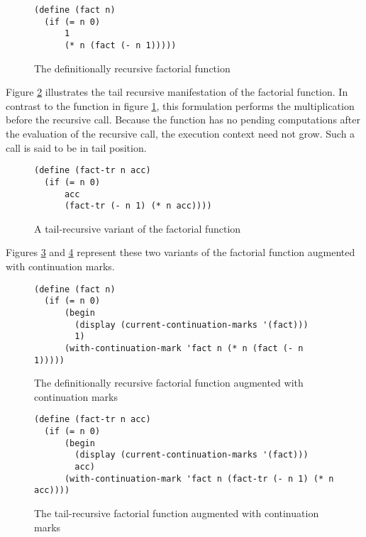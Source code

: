 \documentclass[ms]{byuprop}
\newcounter{definition}
\begin{document}
\begin{figure}
\begin{verbatim}
(define (fact n)
  (if (= n 0)
      1
      (* n (fact (- n 1)))))
\end{verbatim}
\caption{The definitionally recursive factorial function}
\label{fac-rec}
\end{figure}

Figure \ref{fac-tail-rec} illustrates the tail recursive manifestation of the factorial
function. In contrast to the function in figure \ref{fac-rec}, this formulation performs
the multiplication before the recursive call. Because the function has no pending
computations after the evaluation of the recursive call, the execution context need not
grow. Such a call is said to be in tail position.

\begin{figure}
\begin{verbatim}
(define (fact-tr n acc)
  (if (= n 0)
      acc
      (fact-tr (- n 1) (* n acc))))
\end{verbatim}
\caption{A tail-recursive variant of the factorial function}
\label{fac-tail-rec}
\end{figure}

Figures \ref{fac-rec-cm} and \ref{fac-tail-rec-cm} represent these two variants of the
factorial function augmented with continuation marks.


\begin{figure}
\begin{verbatim}
(define (fact n)
  (if (= n 0)
      (begin
        (display (current-continuation-marks '(fact)))
        1)
      (with-continuation-mark 'fact n (* n (fact (- n 1)))))
\end{verbatim}
\caption{The definitionally recursive factorial function augmented with continuation marks}
\label{fac-rec-cm}
\end{figure}

\begin{figure}
\begin{verbatim}
(define (fact-tr n acc)
  (if (= n 0)
      (begin
        (display (current-continuation-marks '(fact)))
        acc)
      (with-continuation-mark 'fact n (fact-tr (- n 1) (* n acc))))
\end{verbatim}
\caption{The tail-recursive factorial function augmented with continuation marks}
\label{fac-tail-rec-cm}
\end{figure}
\end{document}
